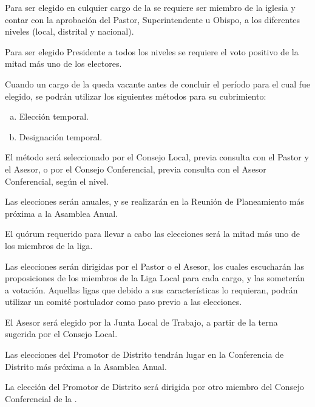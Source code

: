 \label{elecciones}


\article
\label{requisito-cargos}
Para ser elegido en culquier cargo de la \LMJ{} se requiere ser miembro de la iglesia y contar con la aprobación del Pastor, Superintendente u Obispo, a los diferentes niveles (local, distrital y nacional).

\article
\label{requisito-presidente}
Para ser elegido Presidente a todos los niveles se requiere el voto positivo de la mitad más uno de los electores.

\article
\label{cargos-vacantes}
Cuando un cargo de la \LMJ{} queda vacante antes de concluir el período para el cual fue elegido, se podrán utilizar los siguientes métodos para su cubrimiento:
\begin{enumerate}[a)]
    \item Elección temporal.
    \item Designación temporal.
\end{enumerate}
El método será seleccionado por el Consejo Local, previa consulta con el Pastor y el Asesor, o por el Consejo Conferencial, previa consulta con el Asesor Conferencial, según el nivel.


\article
Las elecciones serán anuales, y se realizarán en la Reunión de Planeamiento más próxima a la Asamblea Anual.

\article
El quórum requerido para llevar a cabo las elecciones será la mitad más uno de los miembros de la liga.

\article
Las elecciones serán dirigidas por el Pastor o el Asesor, los cuales escucharán las proposiciones de los miembros de la Liga Local para cada cargo, y las someterán a votación. Aquellas ligas que debido a sus características lo requieran, podrán utilizar un comité postulador como paso previo a las elecciones.

\article
El Asesor será elegido por la Junta Local de Trabajo, a partir de la terna sugerida por el Consejo Local.


\article
Las elecciones del Promotor de Distrito tendrán lugar en la Conferencia de Distrito más próxima a la Asamblea Anual.

\article
\label{direccion-eleccion-promotor}
La elección del Promotor de Distrito será dirigida por otro miembro del Consejo Conferencial de la \LMJ{}.

